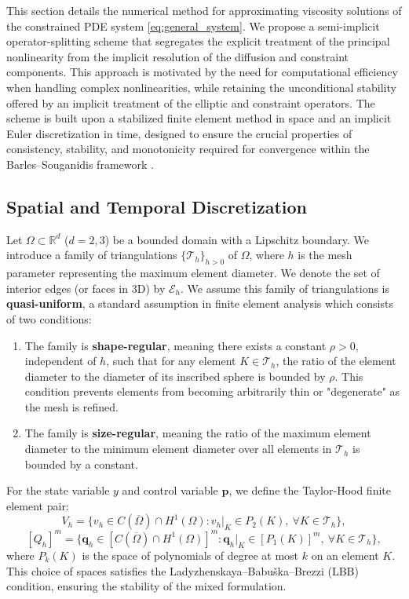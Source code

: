 \documentclass[pdflatex,sn-mathphys-num]{sn-jnl}%
\theoremstyle{thmstyleone}%
\numberwithin{equation}{section}
\begin{document}
This section details the numerical method for approximating viscosity solutions of the constrained PDE system \eqref{eq:general_system}. We propose a semi-implicit operator-splitting scheme that segregates the explicit treatment of the principal nonlinearity from the implicit resolution of the diffusion and constraint components. This approach is motivated by the need for computational efficiency when handling complex nonlinearities, while retaining the unconditional stability offered by an implicit treatment of the elliptic and constraint operators. The scheme is built upon a stabilized finite element method in space and an implicit Euler discretization in time, designed to ensure the crucial properties of consistency, stability, and monotonicity required for convergence within the Barles--Souganidis framework \cite{barles1991convergence}.

\subsection{Spatial and Temporal Discretization}

Let $\Omega \subset \mathbb{R}^d$ ($d=2,3$) be a bounded domain with a Lipschitz boundary. We introduce a family of triangulations $\{\mathcal{T}_h\}_{h>0}$ of $\Omega$, where $h$ is the mesh parameter representing the maximum element diameter. We denote the set of interior edges (or faces in 3D) by $\mathcal{E}_h$. We assume this family of triangulations is \textbf{quasi-uniform}, a standard assumption in finite element analysis which consists of two conditions:
\begin{enumerate}
    \item[(i)] The family is \textbf{shape-regular}, meaning there exists a constant $\rho > 0$, independent of $h$, such that for any element $K \in \mathcal{T}_h$, the ratio of the element diameter to the diameter of its inscribed sphere is bounded by $\rho$. This condition prevents elements from becoming arbitrarily thin or "degenerate" as the mesh is refined.
    \item[(ii)] The family is \textbf{size-regular}, meaning the ratio of the maximum element diameter to the minimum element diameter over all elements in $\mathcal{T}_h$ is bounded by a constant.
\end{enumerate}

For the state variable $y$ and control variable $\bm{p}$, we define the Taylor-Hood finite element pair:
$$V_h = \{ v_h \in C(\overline{\Omega}) \cap H^1(\Omega) : v_h|_K \in P_2(K), \ \forall K \in \mathcal{T}_h \},$$
$$[Q_h]^m = \{ \bm{q}_h \in [C(\overline{\Omega}) \cap H^1(\Omega)]^m : \bm{q}_h|_K \in [P_1(K)]^m, \ \forall K \in \mathcal{T}_h \},$$
where $P_k(K)$ is the space of polynomials of degree at most $k$ on an element $K$. This choice of spaces satisfies the Ladyzhenskaya--Babuška--Brezzi (LBB) condition, ensuring the stability of the mixed formulation.
\end{document}
